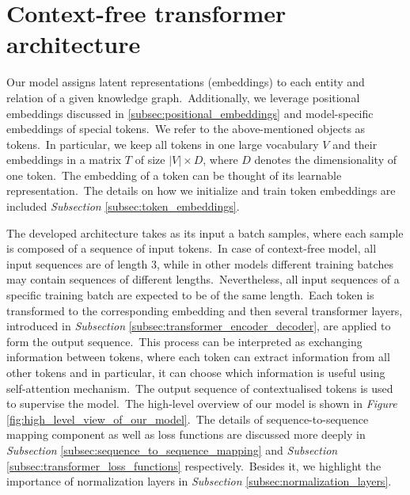 \documentclass[longabstract, english, mgr]{iithesis}
\theoremstyle{default_theorem_style}\newtheorem{theorem}{Theorem}
\theoremstyle{default_theorem_style}\newtheorem{definition}{Definition}
\begin{document}
\section{Context-free transformer architecture}\label{sec:context_free_model}

Our model assigns latent representations (embeddings) to each entity and relation of a given knowledge
graph.\ Additionally, we leverage positional embeddings discussed in \ref{subsec:positional_embeddings} and
model-specific embeddings of special tokens.\ We refer to the above-mentioned objects as tokens.\ In particular, we
keep all tokens in one large vocabulary $V$ and their embeddings in a matrix $T$ of size $|V| \times D$, where $D$
denotes the dimensionality of one token.\ The embedding of a token can be thought of its learnable
representation.\ The details on how we initialize and train token embeddings are
included \textit{Subsection} \ref{subsec:token_embeddings}.\newline

\noindent The developed architecture takes as its input a batch samples, where each sample is composed of a sequence of
input tokens.\ In case of context-free model, all input sequences are of length 3, while in other models different
training batches may contain sequences of different lengths.\ Nevertheless, all input sequences of a specific
training batch are expected to be of the same length.\ Each token is transformed to the corresponding embedding and then
several transformer layers, introduced in \textit{Subsection} \ref{subsec:transformer_encoder_decoder}, are applied to
form the output sequence.\ This process can be interpreted as exchanging information between tokens, where each token
can extract information from all other tokens and in particular, it can choose which information is useful using
self-attention mechanism.\ The output sequence of contextualised tokens is used to supervise the model.\ The high-level
overview of our model is shown in \textit{Figure} \ref{fig:high_level_view_of_our_model}.\ The details of
sequence-to-sequence mapping component as well as loss functions are discussed more deeply in \textit{Subsection}
\ref{subsec:sequence_to_sequence_mapping} and \textit{Subsection} \ref{subsec:transformer_loss_functions}
respectively.\ Besides it, we highlight the importance of normalization layers in \textit{Subsection}
\ref{subsec:normalization_layers}.\newline
\end{document}
